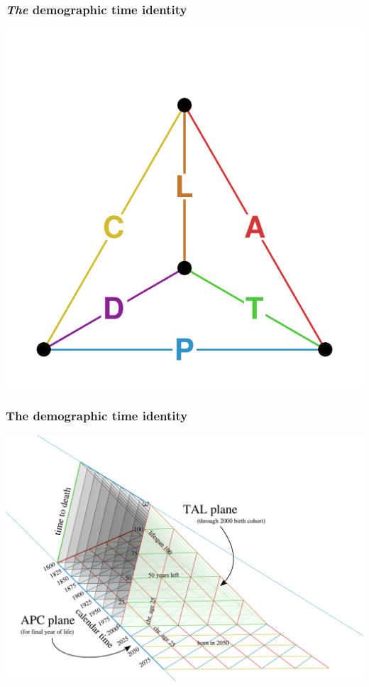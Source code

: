 \documentclass[20pt]{beamer}
\begin{document}
\begin{frame}
\frametitle{\textit{The} demographic time identity}
\vspace{-4em}
\begin{center}
\includegraphics[scale=1.7]{Figures/TetraHedronEdgesOnly.pdf}
\end{center}
\end{frame}


\begin{frame}
\frametitle{The demographic time identity}
\vspace{-4em}
\begin{center}
\includegraphics[scale=.8]{Figures/TALisomarkedup2PAA.pdf}
\end{center}
\end{frame}
\end{document}
